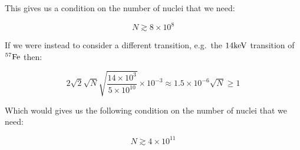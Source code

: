 \documentclass[
]{article}
\renewcommand{\[}{\begin{equation}}
\renewcommand{\]}{\end{equation}}
\begin{document}
This gives us a condition on the number of nuclei that we need:

\[
N \gtrsim 8 \times 10^8
\]

If we were instead to consider a different transition, e.g.~the
\(\rm 14keV\) transition of \(\rm ^{57}Fe\) then:

\[
2\sqrt{2} \sqrt{N}\sqrt{\frac{14\times10^3}{5\times 10^{10}}}  \times 10^{-3} \approx 1.5 \times 10^{-6} \sqrt{N} \ge 1
\]

Which would gives us the following condition on the number of nuclei
that we need:

\[
N \gtrsim 4 \times 10^{11}
\]

\printbibliography
\end{document}
